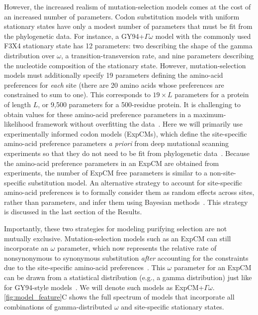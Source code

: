 \documentclass[11pt]{article}
\begin{document}
However, the increased realism of mutation-selection models comes at the cost of an increased number of parameters. 
Codon substitution models with uniform stationary states have only a modest number of parameters that must be fit from the phylogenetic data.
For instance, a GY94+$\Gamma\omega$ model with the commonly used F3X4 stationary state has 12 parameters: two describing the shape of the gamma distribution over $\omega$, a transition-transversion rate, and nine parameters describing the nucleotide composition of the stationary state.
However, mutation-selection models must additionally specify 19 parameters defining the amino-acid preferences for \emph{each} site (there are 20 amino acids whose preferences are constrained to sum to one).
This corresponds to $19\times L$ parameters for a protein of length $L$, or 9,500 parameters for a 500-residue protein.
It is challenging to obtain values for these amino-acid preference parameters in a maximum-likelihood framework without overfitting the data~\citep{rodrigue2013statistical}.
Here we will primarily use experimentally informed codon models (ExpCMs), which define the site-specific amino-acid preference parameters \textit{a priori} from deep mutational scanning experiments so that they do not need to be fit from phylogenetic data~\citep[see Methods and][]{bloom2014experimentally, hilton2017phydms, bloom2017identification}.
Because the amino-acid preference parameters in an ExpCM are obtained from experiments, the number of ExpCM free parameters is similar to a non-site-specific substitution model.
An alternative strategy to account for site-specific amino-acid preferences is to formally consider them as random effects across sites, rather than parameters, and infer them using Bayesian methods~\citep{lartillot2004bayesian, rodrigue2014site}.
This strategy is discussed in the last section of the Results.

Importantly, these two strategies for modeling purifying selection are not mutually exclusive.
Mutation-selection models such as an ExpCM can still incorporate an $\omega$ parameter, which now represents the relative rate of nonsynonymous to synonymous substitution \emph{after} accounting for the constraints due to the site-specific amino-acid preferences~\citep{bloom2017identification,rodrigue2017detecting}.
This $\omega$ parameter for an ExpCM can be drawn from a statistical distribution (e.g., a gamma distribution) just like for GY94-style models~\citep{rodrigue2014site,haddox2018mapping}. 
We will denote such models as ExpCM+$\Gamma\omega$.
\ref{fig:model_feature}C shows the full spectrum of models that incorporate all combinations of gamma-distributed $\omega$ and site-specific stationary states.
\end{document}
